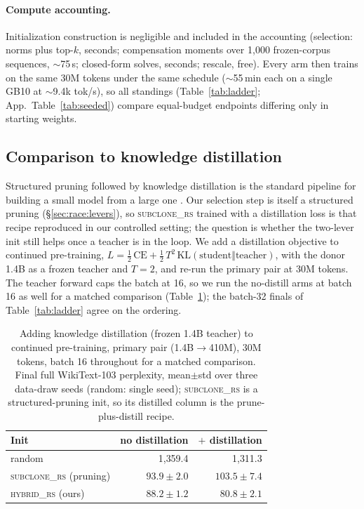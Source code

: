 \paragraph{Compute accounting.}
Initialization construction is negligible and included in the accounting
(selection: norms plus top-$k$, seconds; compensation moments over 1{,}000
frozen-corpus sequences, $\sim$75\,s; closed-form solves, seconds; rescale,
free). Every arm then trains on the same 30M tokens under the same
schedule ($\sim$55\,min each on a single GB10 at $\sim$9.4k tok/s), so all
standings
(Table~\ref{tab:ladder}; App.~Table~\ref{tab:seeded}) compare equal-budget
endpoints differing only in starting weights.

\subsection{Comparison to knowledge distillation}
\label{sec:race:distill}

Structured pruning followed by knowledge distillation is the standard pipeline
for building a small model from a large one
\citep{muralidharan2024minitron,xia2024sheared}. Our selection step is itself a
structured pruning (\S\ref{sec:race:levers}), so \textsc{subclone\_rs} trained
with a distillation loss is that recipe reproduced in our controlled setting; the
question is whether the two-lever init still helps once a teacher is in the loop.
We add a distillation objective to continued pre-training,
$L=\tfrac12\,\mathrm{CE}+\tfrac12\,T^2\,\mathrm{KL}(\text{student}\Vert\text{teacher})$,
with the donor 1.4B as a frozen teacher and $T{=}2$, and re-run the primary pair
at 30M tokens. The teacher forward caps the batch at 16, so we run the no-distill
arms at batch 16 as well for a matched comparison (Table~\ref{tab:distill}); the
batch-32 finals of Table~\ref{tab:ladder} agree on the ordering.

\begin{table}[!htb]
\centering
\footnotesize
\caption{Adding knowledge distillation (frozen 1.4B teacher) to continued
pre-training, primary pair (1.4B$\to$410M), 30M tokens, batch 16 throughout for a
matched comparison. Final full WikiText-103 perplexity, mean$\pm$std over three
data-draw seeds (random: single seed); \textsc{subclone\_rs} is a
structured-pruning init, so its distilled column is the prune-plus-distill
recipe.}
\label{tab:distill}
\begin{tabular}{lrr}
\toprule
Init & no distillation & $+$ distillation \\
\midrule
random                    & 1{,}359.4 & 1{,}311.3 \\
\textsc{subclone\_rs} (pruning) & $93.9\pm2.0$ & $103.5\pm7.4$ \\
\textsc{hybrid\_rs} (ours)      & $\mathbf{88.2\pm1.2}$ & $\mathbf{80.8\pm2.1}$ \\
\bottomrule
\end{tabular}
\end{table}

